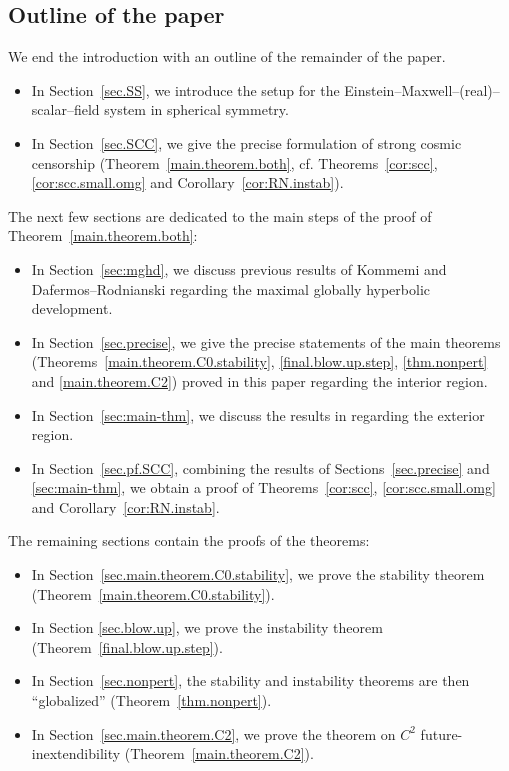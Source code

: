 \documentclass[10pt, reqno]{amsart}
\theoremstyle{definition}
\theoremstyle{remark}
\numberwithin{equation}{section}
\newcommand{\0}{\emptyset}
\begin{document}
\subsection{Outline of the paper}\label{sec.outline} 
We end the introduction with an outline of the remainder of the paper. 
\begin{itemize}
\item In Section~\ref{sec.SS}, we introduce the setup for the Einstein--Maxwell--(real)--scalar--field system in spherical symmetry.
\item In Section~\ref{sec.SCC}, we give the precise formulation of strong cosmic censorship (Theorem~\ref{main.theorem.both}, cf. Theorems~\ref{cor:scc}, \ref{cor:scc.small.omg} and Corollary~\ref{cor:RN.instab}).
\end{itemize}
The next few sections are dedicated to the main steps of the proof of Theorem~\ref{main.theorem.both}:
\begin{itemize}
\item In Section~\ref{sec:mghd}, we discuss previous results of Kommemi \cite{Kommemi} and Dafermos--Rodnianski \cite{DRPL} regarding the maximal globally hyperbolic development. 
\item In Section~\ref{sec.precise}, we give the precise statements of the main theorems (Theorems~\ref{main.theorem.C0.stability}, \ref{final.blow.up.step}, \ref{thm.nonpert} and \ref{main.theorem.C2}) proved in this paper regarding the interior region. 
\item In Section~\ref{sec:main-thm}, we discuss the results in \cite{LO.exterior} regarding the exterior region. 
\item In Section~\ref{sec.pf.SCC}, combining the results of Sections~\ref{sec.precise} and \ref{sec:main-thm}, we obtain a proof of Theorems~\ref{cor:scc}, \ref{cor:scc.small.omg} and Corollary~\ref{cor:RN.instab}.
\end{itemize}
The remaining sections contain the proofs of the theorems:
\begin{itemize}
\item In Section~\ref{sec.main.theorem.C0.stability}, we prove the stability theorem (Theorem~\ref{main.theorem.C0.stability}). 
\item In Section \ref{sec.blow.up}, we prove the instability theorem (Theorem~\ref{final.blow.up.step}). 
\item In Section~\ref{sec.nonpert}, the stability and instability theorems are then ``globalized'' (Theorem~\ref{thm.nonpert}). 
\item In Section~\ref{sec.main.theorem.C2}, we prove the theorem on $C^2$ future-inextendibility (Theorem~\ref{main.theorem.C2}). 
\end{itemize}
\end{document}
